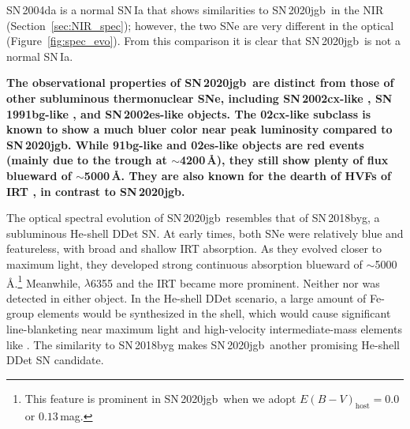 \documentclass[twocolumn]{aastex631}
\newcommand{\sn}{SN\,2020jgb}
\newcommand{\revise}[1]{\textbf{#1}}
\begin{document}
SN\,2004da is a normal SN\,Ia that shows similarities to \sn\ in the NIR (Section~\ref{sec:NIR_spec}); however, the two SNe are very different in the optical (Figure~\ref{fig:spec_evo}). From this comparison it is clear that \sn\ is not a normal SN\,Ia. 

\revise{The observational properties of \sn\ are distinct from those of other subluminous thermonuclear SNe, including SN\,2002cx-like \citep[02cx-like\footnote{This subclass is also referred to as Type Iax SNe \citep{Foley_Iax_2013}};][]{Li_02cx_2003}, SN\,1991bg-like \citep[91bg-like;][]{Filippenko_91bg_1992}, and SN\,2002es-like \citep[02es-like;][]{Ganeshalingam_02es_2012} objects. The 02cx-like subclass is known to show a much bluer color near peak luminosity \citep[$g-r\approx0$\,mag;][]{Miller_2017} compared to \sn. While 91bg-like and 02es-like objects are red events (mainly due to the \ion{Ti}{2} trough at $\sim$4200\,\AA), they still show plenty of flux blueward of $\sim$5000\,\AA. They are also known for the dearth of HVFs of \ion{Ca}{2} IRT \citep[e.g.,][]{Silverman_HVF_2015}, in contrast to \sn.}

The optical spectral evolution of \sn\ resembles that of SN\,2018byg, a subluminous He-shell DDet SN. At early times, both SNe were relatively blue and featureless, with broad and shallow  IRT absorption. As they evolved closer to maximum light, they developed strong continuous absorption blueward of $\sim$5000\,\AA.\footnote{This feature is prominent in \sn\ when we adopt $E(B-V)_\mathrm{host} = 0.0$ or $0.13$\,mag.} Meanwhile,  $\lambda$6355 and the  IRT became more prominent. Neither  nor  was detected in either object. In the He-shell DDet scenario, a large amount of Fe-group elements would be synthesized in the shell, which would cause significant line-blanketing near maximum light \citep{Kromer_DD_2010, polin_observational_2019} and high-velocity intermediate-mass elements like  \citep{Fink_DD_2010, Kromer_DD_2010,Shen_DD_2014}. The similarity to SN\,2018byg makes \sn\ another promising He-shell DDet SN candidate.
\end{document}
